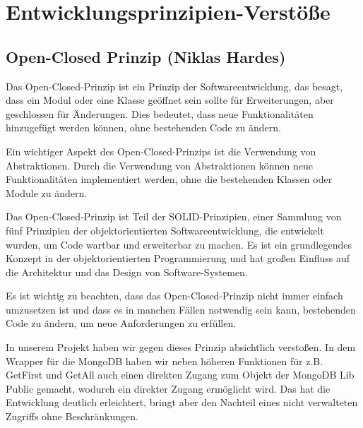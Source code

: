 
\section{Entwicklungsprinzipien-Verstöße}

\subsection*{Open-Closed Prinzip (Niklas Hardes)}

Das Open-Closed-Prinzip ist ein Prinzip der Softwareentwicklung, das besagt, dass ein Modul oder eine Klasse geöffnet sein sollte für Erweiterungen, aber geschlossen für Änderungen. Dies bedeutet, dass neue Funktionalitäten hinzugefügt werden können, ohne bestehenden Code zu ändern.

Ein wichtiger Aspekt des Open-Closed-Prinzips ist die Verwendung von Abstraktionen. Durch die Verwendung von Abstraktionen können neue Funktionalitäten implementiert werden, ohne die bestehenden Klassen oder Module zu ändern.

Das Open-Closed-Prinzip ist Teil der SOLID-Prinzipien, einer Sammlung von fünf Prinzipien der objektorientierten Softwareentwicklung, die entwickelt wurden, um Code wartbar und erweiterbar zu machen. Es ist ein grundlegendes Konzept in der objektorientierten Programmierung und hat großen Einfluss auf die Architektur und das Design von Software-Systemen.

Es ist wichtig zu beachten, dass das Open-Closed-Prinzip nicht immer einfach umzusetzen ist und dass es in manchen Fällen notwendig sein kann, bestehenden Code zu ändern, um neue Anforderungen zu erfüllen.

In unserem Projekt haben wir gegen dieses Prinzip absichtlich verstoßen. In dem Wrapper für die MongoDB haben wir neben höheren Funktionen für z.B. GetFirst und GetAll auch einen direkten Zugang zum Objekt der MongoDB Lib Public gemacht, wodurch ein direkter Zugang ermöglicht wird. Das hat die Entwicklung deutlich erleichtert, bringt aber den Nachteil eines nicht verwalteten Zugriffs ohne Beschränkungen.